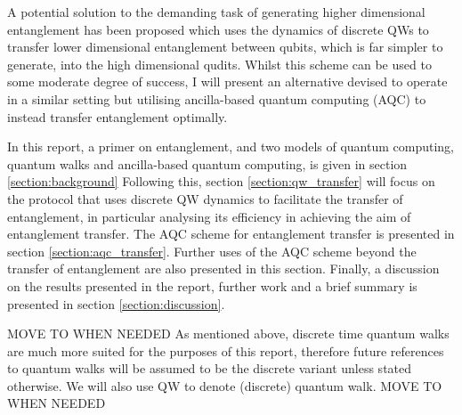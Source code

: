 A potential solution to the demanding task of generating higher dimensional entanglement has been proposed \cite{giordani2020} which uses the dynamics of discrete QWs to transfer lower dimensional entanglement between qubits, which is far simpler to generate, into the high dimensional qudits.
Whilst this scheme can be used to some moderate degree of success, I will present an alternative devised to operate in a similar setting but utilising ancilla-based quantum computing (AQC) to instead transfer entanglement optimally.\newline

In this report, a primer on entanglement, and two models of quantum computing, quantum walks and ancilla-based quantum computing, is given in section {\ref{section:background}}
Following this, section {\ref{section:qw_transfer}} will focus on the protocol that uses discrete QW dynamics to facilitate the transfer of entanglement, in particular analysing its efficiency in achieving the aim of entanglement transfer. 
The AQC scheme for entanglement transfer is presented in section \ref{section:aqc_transfer}. 
Further uses of the AQC scheme beyond the transfer of entanglement are also presented in this section. 
Finally, a discussion on the results presented in the report, further work and a brief summary is presented in section {\ref{section:discussion}}.

MOVE TO WHEN NEEDED
As mentioned above, discrete time quantum walks are much more suited for the purposes of this report, therefore future references to quantum walks will be assumed to be the discrete variant unless stated otherwise. 
We will also use QW to denote (discrete) quantum walk. 
MOVE TO WHEN NEEDED